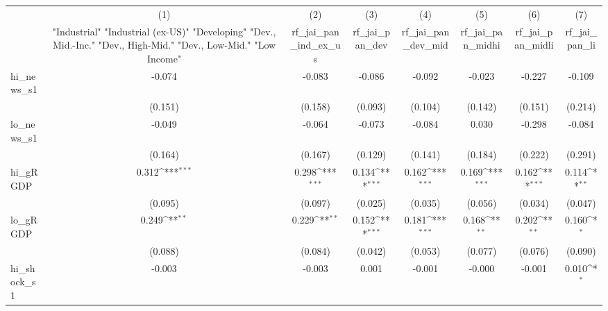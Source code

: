 {
\def\sym#1{\ifmmode^{#1}\else\(^{#1}\)\fi}
\begin{tabular}{l*{7}{c}}
\toprule
            &\multicolumn{1}{c}{(1)}&\multicolumn{1}{c}{(2)}&\multicolumn{1}{c}{(3)}&\multicolumn{1}{c}{(4)}&\multicolumn{1}{c}{(5)}&\multicolumn{1}{c}{(6)}&\multicolumn{1}{c}{(7)}\\
            &\multicolumn{1}{c}{ "Industrial" "Industrial (ex-US)" "Developing" "Dev., Mid.-Inc." "Dev., High-Mid."  "Dev., Low-Mid." "Low Income" }&\multicolumn{1}{c}{rf\_jai\_pan\_ind\_ex\_us}&\multicolumn{1}{c}{rf\_jai\_pan\_dev}&\multicolumn{1}{c}{rf\_jai\_pan\_dev\_mid}&\multicolumn{1}{c}{rf\_jai\_pan\_midhi}&\multicolumn{1}{c}{rf\_jai\_pan\_midli}&\multicolumn{1}{c}{rf\_jai\_pan\_li}\\
\midrule
hi\_news\_s1  &      -0.074         &      -0.083         &      -0.086         &      -0.092         &      -0.023         &      -0.227         &      -0.109         \\
            &     (0.151)         &     (0.158)         &     (0.093)         &     (0.104)         &     (0.142)         &     (0.151)         &     (0.214)         \\
\addlinespace
lo\_news\_s1  &      -0.049         &      -0.064         &      -0.073         &      -0.084         &       0.030         &      -0.298         &      -0.084         \\
            &     (0.164)         &     (0.167)         &     (0.129)         &     (0.141)         &     (0.184)         &     (0.222)         &     (0.291)         \\
\addlinespace
hi\_gRGDP    &       0.312\sym{***}&       0.298\sym{***}&       0.134\sym{***}&       0.162\sym{***}&       0.169\sym{***}&       0.162\sym{***}&       0.114\sym{**} \\
            &     (0.095)         &     (0.097)         &     (0.025)         &     (0.035)         &     (0.056)         &     (0.034)         &     (0.047)         \\
\addlinespace
lo\_gRGDP    &       0.249\sym{**} &       0.229\sym{**} &       0.152\sym{***}&       0.181\sym{***}&       0.168\sym{**} &       0.202\sym{**} &       0.160\sym{*}  \\
            &     (0.088)         &     (0.084)         &     (0.042)         &     (0.053)         &     (0.077)         &     (0.076)         &     (0.090)         \\
\addlinespace
hi\_shock\_s1 &      -0.003         &      -0.003         &       0.001         &      -0.001         &      -0.000         &      -0.001         &       0.010\sym{*}  \\

\end{tabular}}
